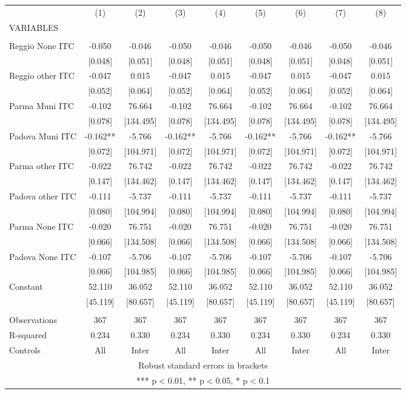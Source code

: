 \begin{tabular}{lcccccccc} \hline
 & (1) & (2) & (3) & (4) & (5) & (6) & (7) & (8) \\
VARIABLES &  &  &  &  &  &  &  &  \\ \hline
 &  &  &  &  &  &  &  &  \\
Reggio None ITC & -0.050 & -0.046 & -0.050 & -0.046 & -0.050 & -0.046 & -0.050 & -0.046 \\
 & [0.048] & [0.051] & [0.048] & [0.051] & [0.048] & [0.051] & [0.048] & [0.051] \\
Reggio other ITC & -0.047 & 0.015 & -0.047 & 0.015 & -0.047 & 0.015 & -0.047 & 0.015 \\
 & [0.052] & [0.064] & [0.052] & [0.064] & [0.052] & [0.064] & [0.052] & [0.064] \\
Parma Muni ITC & -0.102 & 76.664 & -0.102 & 76.664 & -0.102 & 76.664 & -0.102 & 76.664 \\
 & [0.078] & [134.495] & [0.078] & [134.495] & [0.078] & [134.495] & [0.078] & [134.495] \\
Padova Muni ITC & -0.162** & -5.766 & -0.162** & -5.766 & -0.162** & -5.766 & -0.162** & -5.766 \\
 & [0.072] & [104.971] & [0.072] & [104.971] & [0.072] & [104.971] & [0.072] & [104.971] \\
Parma other ITC & -0.022 & 76.742 & -0.022 & 76.742 & -0.022 & 76.742 & -0.022 & 76.742 \\
 & [0.147] & [134.462] & [0.147] & [134.462] & [0.147] & [134.462] & [0.147] & [134.462] \\
Padova other ITC & -0.111 & -5.737 & -0.111 & -5.737 & -0.111 & -5.737 & -0.111 & -5.737 \\
 & [0.080] & [104.994] & [0.080] & [104.994] & [0.080] & [104.994] & [0.080] & [104.994] \\
Parma None ITC & -0.020 & 76.751 & -0.020 & 76.751 & -0.020 & 76.751 & -0.020 & 76.751 \\
 & [0.066] & [134.508] & [0.066] & [134.508] & [0.066] & [134.508] & [0.066] & [134.508] \\
Padova None ITC & -0.107 & -5.706 & -0.107 & -5.706 & -0.107 & -5.706 & -0.107 & -5.706 \\
 & [0.066] & [104.985] & [0.066] & [104.985] & [0.066] & [104.985] & [0.066] & [104.985] \\
Constant & 52.110 & 36.052 & 52.110 & 36.052 & 52.110 & 36.052 & 52.110 & 36.052 \\
 & [45.119] & [80.657] & [45.119] & [80.657] & [45.119] & [80.657] & [45.119] & [80.657] \\
 &  &  &  &  &  &  &  &  \\
Observations & 367 & 367 & 367 & 367 & 367 & 367 & 367 & 367 \\
R-squared & 0.234 & 0.330 & 0.234 & 0.330 & 0.234 & 0.330 & 0.234 & 0.330 \\
 Controls & All & Inter & All & Inter & All & Inter & All & Inter \\ \hline
\multicolumn{9}{c}{ Robust standard errors in brackets} \\
\multicolumn{9}{c}{ *** p$<$0.01, ** p$<$0.05, * p$<$0.1} \\
\end{tabular}
